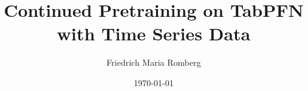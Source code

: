 \documentclass[english]{abarbeit}
\title{Continued Pretraining on TabPFN with Time Series Data}
\author{Friedrich Maria Romberg}
\date{\today} %
\begin{document}
\maketitle
\tableofcontents



\mainmatter













\backmatter

\iffalse
\ifcsname listofalgorithms\endcsname
\listofalgorithms
\fi\fi

\appendix
%
\cleardoublepage

\end{document}

